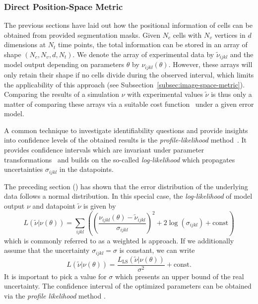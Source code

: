 \subsubsection{Direct Position-Space Metric}
\label{subsec:direct-metric}
The previous sections have laid out how the positional information of cells can be obtained from
provided segmentation masks.
Given $N_c$ cells with $N_v$ vertices in $d$ dimensions at $N_t$ time points, the total information
can be stored in an array of shape $(N_c,N_v,d,N_t)$.
We denote the array of experimental data by $\tilde{\nu}_{ijkl}$ and the model output depending on
parameters $\theta$ by $\nu_{ijkl}(\theta)$.
However, these arrays will only retain their shape if no cells divide during the observed interval,
which limits the applicability of this approach (see Subsection~\ref{subsec:image-space-metric}).
Comparing the results of a simulation $\nu$ with experimental values $\tilde{\nu}$ is thus only a
matter of comparing these arrays via a suitable cost function~\cite{Wang2020} under a given error
model.

A common technique to investigate identifiability questions and provide insights into confidence
levels of the obtained results is the \textit{profile-likelihood}
method~\cite{Murphy2000,Kreutz2013,Tnsing2023}.
It provides confidence intervals which are invariant under parameter
transformations~\cite{Meeker1995} and  builds on the so-called \textit{log-likelihood} which
propagates uncertainties $\sigma_{ijkl}$ in the datapoints.

The preceding section () has shown that
the error distribution of the underlying data follows a normal distribution.
In this special case, the \textit{log-likelihood} of model output $\nu$ and datapoint $\tilde{\nu}$
is given by
\begin{equation}
    L(\tilde{\nu}|\nu(\theta)) = \sum\limits_{ijkl}\left(\left(\frac{\nu_{ijkl}(\theta)-\tilde{\nu}_{ijkl}}{\sigma_{ijkl}}\right)^2
    + 2 \log(\sigma_{ijkl})
    +\text{const}\right)
    \label{eq:parameter-estimation-log-likelihood}
\end{equation}
which is commonly referred to as a weighted \ac{ls} approach.
If we additionally assume that the uncertainty $\sigma_{ijkl}=\sigma$ is constant, we can write
\begin{equation}
    L(\tilde{\nu}|\nu(\theta))
        = \frac{L_\text{LS}(\tilde{\nu}|\nu(\theta))}{\sigma^2} + \text{const}.
\end{equation}
It is important to pick a value for $\sigma$ which presents an upper bound of the real uncertainty.
The confidence interval of the optimized parameters can be obtained via the
\textit{profile likelihood} method \cite{Kreutz2013}.

